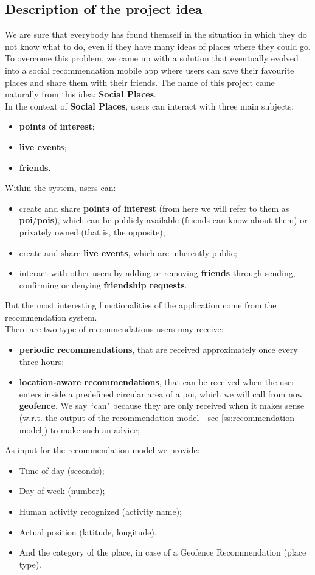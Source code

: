 \documentclass[../../main]{subfiles}
\begin{document}
\label{ss:description-project-idea}
\subsection{Description of the project idea}
We are sure that everybody has found themself in the situation in which they do not know what to do, even if they have many ideas of places where they could go.
To overcome this problem, we came up with a solution that eventually evolved into a social recommendation mobile app where users can save their favourite places and share them with their friends.
The name of this project came naturally from this idea: \textbf{Social Places}.\\
In the context of \textbf{Social Places}, users can interact with three main subjects:
\begin{itemize}
    \item \textbf{points of interest};
    \item \textbf{live events};
    \item \textbf{friends}.
\end{itemize}
Within the system, users can:
\begin{itemize}
    \item create and share \textbf{points of interest} (from here we will refer to them as \textbf{poi}/\textbf{pois}), which can be publicly available (friends can know about them) or privately owned (that is, the opposite);
    \item create and share \textbf{live events}, which are inherently public;
    \item interact with other users by adding or removing \textbf{friends} through sending, confirming or denying \textbf{friendship requests}.
\end{itemize}
But the most interesting functionalities of the application come from the recommendation system.\\
There are two type of recommendations users may receive:
\begin{itemize}
    \item \textbf{periodic recommendations}, that are received approximately once every three hours;
    \item \textbf{location-aware recommendations}, that can be received when the user enters inside a predefined circular area of a poi, which we will call from now \textbf{geofence}.
    We say ``can" because they are only received when it makes sense (w.r.t. the output of the recommendation model - see \ref{ss:recommendation-model}) to make such an advice;
\end{itemize}
As input for the recommendation model we provide:
\begin{itemize}
    \item Time of day (seconds);
    \item Day of week (number);
    \item Human activity recognized (activity name);
    \item Actual position (latitude, longitude).
    \item And the category of the place, in case of a Geofence Recommendation (place type).
\end{itemize} 
\end{document}
